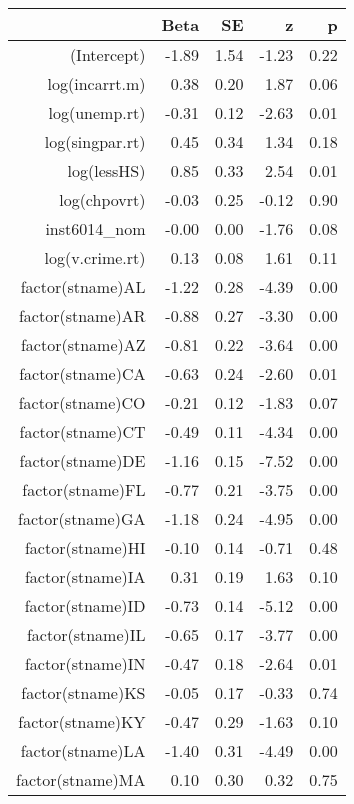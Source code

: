 \begin{table}[ht]
\centering
\begin{tabular}{rrrrr}
  \hline
 & Beta & SE & z & p \\ 
  \hline
(Intercept) & -1.89 & 1.54 & -1.23 & 0.22 \\ 
  log(incarrt.m) & 0.38 & 0.20 & 1.87 & 0.06 \\ 
  log(unemp.rt) & -0.31 & 0.12 & -2.63 & 0.01 \\ 
  log(singpar.rt) & 0.45 & 0.34 & 1.34 & 0.18 \\ 
  log(lessHS) & 0.85 & 0.33 & 2.54 & 0.01 \\ 
  log(chpovrt) & -0.03 & 0.25 & -0.12 & 0.90 \\ 
  inst6014\_nom & -0.00 & 0.00 & -1.76 & 0.08 \\ 
  log(v.crime.rt) & 0.13 & 0.08 & 1.61 & 0.11 \\ 
  factor(stname)AL & -1.22 & 0.28 & -4.39 & 0.00 \\ 
  factor(stname)AR & -0.88 & 0.27 & -3.30 & 0.00 \\ 
  factor(stname)AZ & -0.81 & 0.22 & -3.64 & 0.00 \\ 
  factor(stname)CA & -0.63 & 0.24 & -2.60 & 0.01 \\ 
  factor(stname)CO & -0.21 & 0.12 & -1.83 & 0.07 \\ 
  factor(stname)CT & -0.49 & 0.11 & -4.34 & 0.00 \\ 
  factor(stname)DE & -1.16 & 0.15 & -7.52 & 0.00 \\ 
  factor(stname)FL & -0.77 & 0.21 & -3.75 & 0.00 \\ 
  factor(stname)GA & -1.18 & 0.24 & -4.95 & 0.00 \\ 
  factor(stname)HI & -0.10 & 0.14 & -0.71 & 0.48 \\ 
  factor(stname)IA & 0.31 & 0.19 & 1.63 & 0.10 \\ 
  factor(stname)ID & -0.73 & 0.14 & -5.12 & 0.00 \\ 
  factor(stname)IL & -0.65 & 0.17 & -3.77 & 0.00 \\ 
  factor(stname)IN & -0.47 & 0.18 & -2.64 & 0.01 \\ 
  factor(stname)KS & -0.05 & 0.17 & -0.33 & 0.74 \\ 
  factor(stname)KY & -0.47 & 0.29 & -1.63 & 0.10 \\ 
  factor(stname)LA & -1.40 & 0.31 & -4.49 & 0.00 \\ 
  factor(stname)MA & 0.10 & 0.30 & 0.32 & 0.75 \\ 

\end{tabular}
\end{table}
